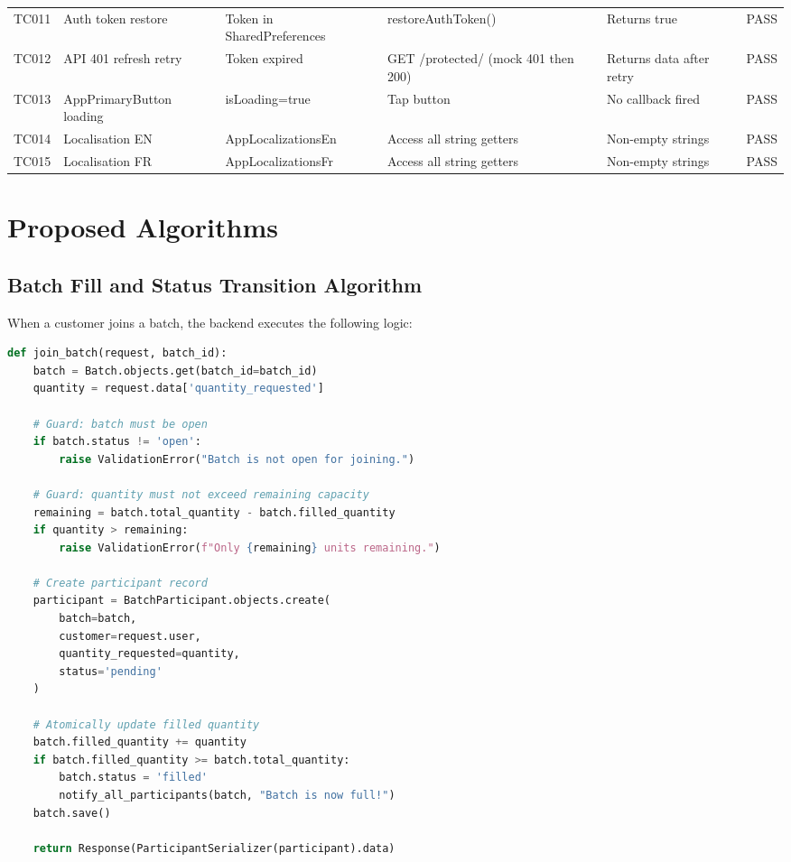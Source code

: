 \documentclass[12pt, a4paper]{report}
\begin{document}
\begin{longtable}{c p{3cm} p{3cm} p{3cm} p{3cm} p{1cm}}
TC011 & Auth token restore & Token in SharedPreferences & restoreAuthToken() & Returns true & PASS\\
\rowcolor{batchitLight}
TC012 & API 401 refresh retry & Token expired & GET /protected/ (mock 401 then 200) & Returns data after retry & PASS\\
TC013 & AppPrimaryButton loading & isLoading=true & Tap button & No callback fired & PASS\\
\rowcolor{batchitLight}
TC014 & Localisation EN & AppLocalizationsEn & Access all string getters & Non-empty strings & PASS\\
TC015 & Localisation FR & AppLocalizationsFr & Access all string getters & Non-empty strings & PASS\\
\end{longtable}


\newpage
\section{Proposed Algorithms}

\subsection{Batch Fill and Status Transition Algorithm}

When a customer joins a batch, the backend executes the following logic:

\begin{lstlisting}[language=Python, caption={Batch fill algorithm (views.py)}]
def join_batch(request, batch_id):
    batch = Batch.objects.get(batch_id=batch_id)
    quantity = request.data['quantity_requested']

    # Guard: batch must be open
    if batch.status != 'open':
        raise ValidationError("Batch is not open for joining.")

    # Guard: quantity must not exceed remaining capacity
    remaining = batch.total_quantity - batch.filled_quantity
    if quantity > remaining:
        raise ValidationError(f"Only {remaining} units remaining.")

    # Create participant record
    participant = BatchParticipant.objects.create(
        batch=batch,
        customer=request.user,
        quantity_requested=quantity,
        status='pending'
    )

    # Atomically update filled quantity
    batch.filled_quantity += quantity
    if batch.filled_quantity >= batch.total_quantity:
        batch.status = 'filled'
        notify_all_participants(batch, "Batch is now full!")
    batch.save()

    return Response(ParticipantSerializer(participant).data)
\end{lstlisting}
\end{document}

